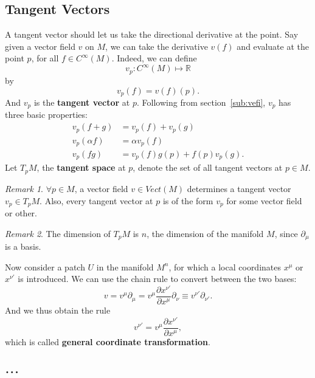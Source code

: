 \documentclass[a4paper,11pt]{article}
\theoremstyle{remark}
\newtheorem{remark}{Remark}[section]
\begin{document}
\subsection{Tangent Vectors}
\label{sub:TV}
A tangent vector should let us take the directional derivative at the
point. Say given a vector field $v$ on $M$, we can take the derivative
$v(f)$ and evaluate at the point $p$, for all $f \in
C^{\infty}(M)$. Indeed, we can define $$v_p: C^{\infty}(M)\mapsto
\mathbb{R}$$ by $$v_p(f)=v(f)(p).$$ And $v_p$ is the \textbf{tangent vector} at
$p$. Following from section~\ref{sub:vefi}, $v_p$ has three basic properties:
\begin{align*}
  v_p (f+g) &= v_p(f) + v_p(g) \\
  v_p(\alpha f) &= \alpha v_p(f) \\
  v_p(f g) &= v_p(f)g(p) + f(p)v_p(g).
\end{align*}
Let $T_pM$, the \textbf{tangent space} at $p$, denote the set of all
tangent vectors at $p\in M$. \par
\begin{remark}
  $\forall p\in M$, a vector field $v\in Vect(M)$ determines a tangent
  vector $v_p\in T_pM$. Also, every tangent vector at $p$ is of the
  form $v_p$ for some vector field or other.\par
\end{remark}
\begin{remark}
  The dimension of $T_pM$ is $n$, the dimension of the manifold
  $M$, since ${\partial_{\mu}}$ is a basis. \par
\end{remark}
Now consider a patch $U$ in the manifold $M^n$, for which a local
coordinates $x^{\mu}$ or $x^{\nu '}$ is introduced. We can use the
chain rule to convert between the two bases:$$v =
v^{\mu}\partial_{\mu} = v^{\mu}\frac{\partial x^{\nu '}}{\partial
  x^{\mu}}\partial_{\nu}\equiv v^{\nu '}\partial_{\nu '}.$$
And we thus obtain the rule$$v^{\nu '} = v^{\mu}\frac{\partial x^{\nu '}}{\partial
  x^{\mu}},$$ which is called \textbf{general coordinate
  transformation}.\par





\section{$\ldots$}
\end{document}
